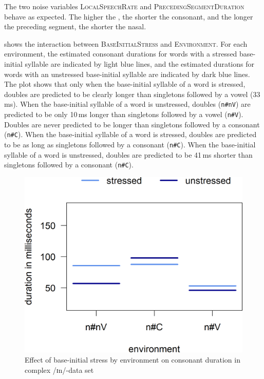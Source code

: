 The two noise variables \textsc{LocalSpeechRate} and \textsc{PrecedingSegmentDuration} behave as expected. The higher the , the shorter the consonant, and the longer the preceding segment, the shorter the nasal. 


 shows the interaction between \textsc{BaseInitialStress} and \textsc{Environment}. For each environment, the estimated consonant durations for words with a stressed base-initial syllable are indicated by light blue lines, and the estimated durations for words with an unstressed base-initial syllable are indicated by dark blue lines. 
The plot shows that only when the base-initial syllable of a word is stressed, doubles are predicted to be clearly longer than singletons followed by a vowel (33\,ms). When the base-initial syllable of a word is unstressed, doubles (\texttt{n\#nV}) are predicted to be only 10\,ms longer than singletons followed by a vowel (\texttt{n\#V}).
Doubles are never predicted to be longer than singletons followed by a consonant  (\texttt{n\#C}).
When the base-initial syllable of a word is stressed, doubles are predicted to be as long as singletons followed by a consonant (\texttt{n\#C}). When the base-initial syllable of a word is unstressed, doubles are predicted to be 41\,ms shorter than singletons followed by a consonant (\texttt{n\#C}).




 	\begin{figure}

 		
 		\includegraphics [scale=0.5] {images/Experiment/InModelInterEnvStress}
		
 		\caption{Effect of base-initial stress by environment on consonant duration in complex /ɪn/-data set}		
 		\label{fig:Env Stress In experiment}

 	\end{figure}%
 	
